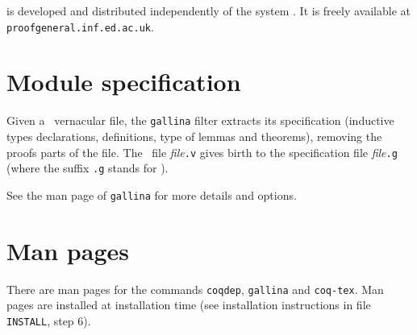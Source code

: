 {\ProofGeneral} is developed and distributed independently of the
system \Coq. It is freely available at \verb!proofgeneral.inf.ed.ac.uk!.


\section[Module specification]{Module specification\label{gallina}}

Given a \Coq\ vernacular file, the {\tt gallina} filter extracts its
specification (inductive types declarations, definitions, type of
lemmas and theorems), removing the proofs parts of the file. The \Coq\
file {\em file}{\tt.v} gives birth to the specification file
{\em file}{\tt.g} (where the suffix {\tt.g} stands for \gallina).

See the man page of {\tt gallina} for more details and options.


\section[Man pages]{Man pages\label{ManPages}}

There are man pages for the commands {\tt coqdep}, {\tt gallina} and
{\tt coq-tex}. Man pages are installed at installation time
(see installation instructions in file {\tt INSTALL}, step 6).


